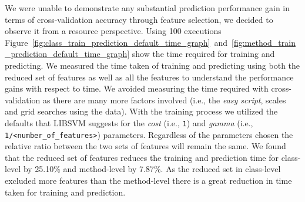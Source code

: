 We were unable to demonstrate any substantial prediction performance gain in terms of cross-validation accuracy through feature selection, we decided to observe it from a resource perspective. Using 100 executions Figure~\ref{fig:class_train_prediction_default_time_graph}~and~\ref{fig:method_train_prediction_default_time_graph} show the time required for training and predicting. We measured the time taken of training and predicting using both the reduced set of features as well as all the features to understand the performance gains with respect to time. We avoided measuring the time required with cross-validation as there are many more factors involved (i.e., the \emph{easy script}, scales and grid searches using the data). With the training process we utilized the defaults that LIBSVM suggests for the \emph{cost} (i.e., \texttt{1}) and \emph{gamma} (i.e., \texttt{1/<number\_of\_features>}) parameters. Regardless of the parameters chosen the relative ratio between the two sets of features will remain the same. We found that the reduced set of features reduces the training and prediction time for class-level by 25.10\% and method-level by 7.87\%. As the reduced set in class-level excluded more features than the method-level there is a great reduction in time taken for training and prediction.
